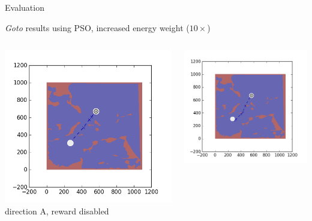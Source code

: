 \documentclass[9pt]{beamer}
\begin{document}
\begin{frame}{Evaluation}
    \begin{block}{\textit{Goto} results using PSO, increased energy weight ($10\times$)}
        \begin{columns}
            \begin{column}{0.25\textwidth}
                \begin{center}
                    \includegraphics[width=\textwidth,trim={2cm 2cm 2cm 2cm},clip]{img/EXP3RG_PathAa_-1_-1_0d001_0.png}
                    \newline
                    \tiny{direction A, reward disabled}
                \end{center}
            \end{column}
            \begin{column}{0.25\textwidth}
                \begin{center}
                    \includegraphics[width=\textwidth,trim={2cm 2cm 2cm 2cm},clip]{img/EXP3RG_PathAa_-1_-1_0d001_-1.png}

\end{center}
\end{column}
\end{columns}
\end{block}
\end{frame}
\end{document}
